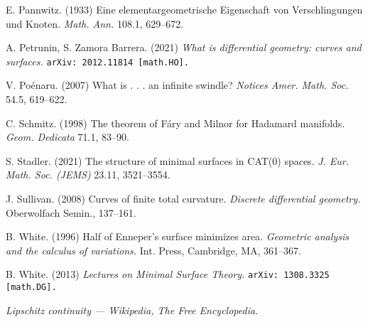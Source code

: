 \documentclass{article}
\theoremstyle{theorem}
\newtheorem{Crofton-type formula}[theorem]{Crofton-type formula}
\newtheorem{Douglas--Rado theorem}[theorem]{Douglas--Rado theorem}
\newtheorem{Extended monotonicity theorem}[theorem]{Extended monotonicity theorem}
\theoremstyle{definition}
\begin{document}
\begin{thebibliography}{2}
E. Pannwitz.
(1933)
Eine elementargeometrische Eigenschaft von Verschlingungen und Knoten.
\textit{Math. Ann.} 108.1, 629--672.


A. Petrunin, S. Zamora Barrera.
(2021)
\textit{What is differential geometry: curves and surfaces.}
\texttt{arXiv: 2012.11814 [math.HO].}


V. Poénaru.
(2007)
What is . . . an infinite swindle?
\textit{Notices Amer. Math. Soc.} 54.5, 619--622.


C. Schmitz.
(1998)
The theorem of Fáry and Milnor for Hadamard manifolds.
\textit{Geom. Dedicata}
71.1, 83--90.


S. Stadler.
(2021)
The structure of minimal surfaces in CAT(0) spaces.
\textit{J. Eur. Math. Soc. (JEMS)}
23.11, 3521--3554.


 J. Sullivan. (2008)
Curves of finite total curvature.
\textit{Discrete differential geometry.} Oberwolfach
Semin., 137--161.


B. White.
(1996)
Half of Enneper’s surface minimizes area.
\textit{Geometric analysis and the calculus
of variations.} Int. Press, Cambridge, MA, 361--367.


B. White. (2013) \textit{Lectures on Minimal Surface Theory.} \texttt{arXiv: 1308.3325 [math.DG].}


 \textit{Lipschitz continuity — Wikipedia, The Free Encyclopedia.}


\end{thebibliography}
\end{document}
